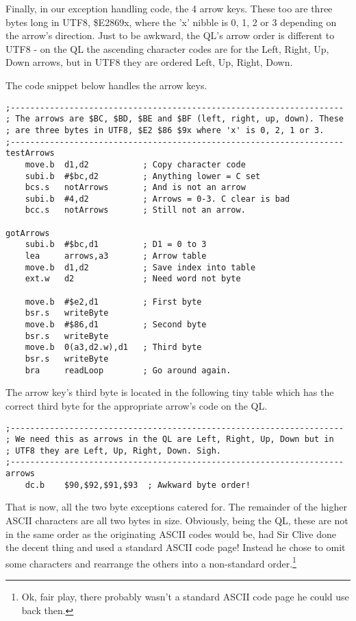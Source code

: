 Finally, in our exception handling code, the 4 arrow keys. These too
are three bytes long in UTF8, \$E2869x, where the 'x' nibble is 0,
1, 2 or 3 depending on the arrow's direction. Just to be awkward,
the QL's arrow order is different to UTF8 - on the QL the ascending
character codes are for the Left, Right, Up, Down arrows, but in UTF8
they are ordered Left, Up, Right, Down. 

The code snippet below handles the arrow keys.

\begin{lstlisting}[firstnumber=last,caption={Ql2utf8: Handling exceptions - the arrow characters}]
;--------------------------------------------------------------------
; The arrows are $BC, $BD, $BE and $BF (left, right, up, down). These
; are three bytes in UTF8, $E2 $86 $9x where 'x' is 0, 2, 1 or 3.
;--------------------------------------------------------------------
testArrows
    move.b  d1,d2           ; Copy character code
    subi.b  #$bc,d2         ; Anything lower = C set
    bcs.s   notArrows       ; And is not an arrow
    subi.b  #4,d2           ; Arrows = 0-3. C clear is bad
    bcc.s   notArrows       ; Still not an arrow.

gotArrows
    subi.b  #$bc,d1         ; D1 = 0 to 3 
    lea     arrows,a3       ; Arrow table
    move.b  d1,d2           ; Save index into table
    ext.w   d2              ; Need word not byte

    move.b  #$e2,d1         ; First byte
    bsr.s   writeByte
    move.b  #$86,d1         ; Second byte
    bsr.s   writeByte
    move.b  0(a3,d2.w),d1   ; Third byte
    bsr.s   writeByte     
    bra     readLoop        ; Go around again.

\end{lstlisting}

The arrow key's third byte is located in the following tiny table
which has the correct third byte for the appropriate arrow's code
on the QL.

\begin{lstlisting}[firstnumber=last,caption={Ql2utf8: The arrow character table}]
;--------------------------------------------------------------------
; We need this as arrows in the QL are Left, Right, Up, Down but in
; UTF8 they are Left, Up, Right, Down. Sigh.
;--------------------------------------------------------------------
arrows
    dc.b    $90,$92,$91,$93  ; Awkward byte order!
\end{lstlisting}

That is now, all the two byte exceptions catered for. The remainder
of the higher ASCII characters are all two bytes in size. Obviously,
being the QL, these are not in the same order as the originating ASCII
codes would be, had Sir Clive done the decent thing and used a standard
ASCII code page! Instead he chose to omit some characters and rearrange
the others into a non-standard order.\footnote{Ok, fair play, there probably wasn't a standard ASCII code page he
could use back then. }

